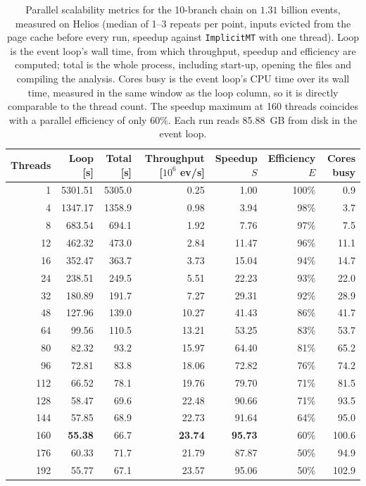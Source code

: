 \begin{table}[htbp]
\centering
\caption{Parallel scalability metrics for the 10-branch chain on $1.31$ billion events, measured on Helios (median of 1--3 repeats per point, inputs evicted from the page cache before every run, speedup against \texttt{ImplicitMT} with one thread). Loop is the event loop's wall time, from which throughput, speedup and efficiency are computed; total is the whole process, including start-up, opening the files and compiling the analysis. Cores busy is the event loop's CPU time over its wall time, measured in the same window as the loop column, so it is directly comparable to the thread count. The speedup maximum at 160 threads coincides with a parallel efficiency of only $60\%$. Each run reads 85.88~GB from disk in the event loop.}
\label{tab:scalability-chain11}
\setlength{\tabcolsep}{5pt}
\begin{tabular}{rrrrrrr}
\toprule
Threads & Loop [s] & Total [s] & Throughput [$10^6$ ev/s] & Speedup $S$ & Efficiency $E$ & Cores busy \\
\midrule
 1 & 5301.51 & 5305.0 & 0.25 & 1.00 & 100\% & 0.9 \\
 4 & 1347.17 & 1358.9 & 0.98 & 3.94 & 98\% & 3.7 \\
 8 & 683.54 & 694.1 & 1.92 & 7.76 & 97\% & 7.5 \\
12 & 462.32 & 473.0 & 2.84 & 11.47 & 96\% & 11.1 \\
16 & 352.47 & 363.7 & 3.73 & 15.04 & 94\% & 14.7 \\
24 & 238.51 & 249.5 & 5.51 & 22.23 & 93\% & 22.0 \\
32 & 180.89 & 191.7 & 7.27 & 29.31 & 92\% & 28.9 \\
48 & 127.96 & 139.0 & 10.27 & 41.43 & 86\% & 41.7 \\
64 & 99.56 & 110.5 & 13.21 & 53.25 & 83\% & 53.7 \\
80 & 82.32 & 93.2 & 15.97 & 64.40 & 81\% & 65.2 \\
96 & 72.81 & 83.8 & 18.06 & 72.82 & 76\% & 74.2 \\
112 & 66.52 & 78.1 & 19.76 & 79.70 & 71\% & 81.5 \\
128 & 58.47 & 69.6 & 22.48 & 90.66 & 71\% & 93.5 \\
144 & 57.85 & 68.9 & 22.73 & 91.64 & 64\% & 95.0 \\
160 & \textbf{55.38} & 66.7 & \textbf{23.74} & \textbf{95.73} & 60\% & 100.6 \\
176 & 60.33 & 71.7 & 21.79 & 87.87 & 50\% & 94.9 \\
192 & 55.77 & 67.1 & 23.57 & 95.06 & 50\% & 102.9 \\
\bottomrule
\end{tabular}
\end{table}

